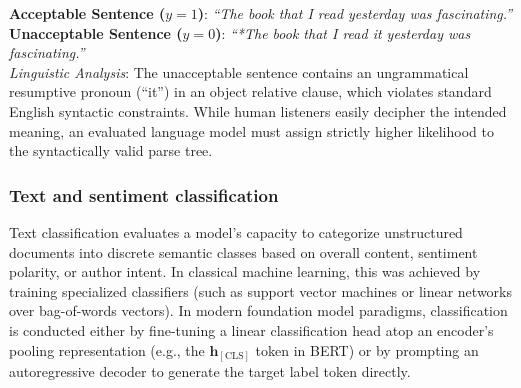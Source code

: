 \documentclass[../../../main.tex]{subfiles}
\begin{document}
\begin{center}
\begin{minipage}{0.95\textwidth}
\begin{tcolorbox}[colback=cardBg,colframe=cardLine,arc=2pt,boxrule=0.5pt,title=\textbf{Task Example: Grammatical Acceptability (CoLA)}]
\small\sffamily
\textbf{Acceptable Sentence ($y = 1$)}: \textit{``The book that I read yesterday was fascinating.''} \\
\textbf{Unacceptable Sentence ($y = 0$)}: \textit{``*The book that I read it yesterday was fascinating.''} \\
\textit{Linguistic Analysis}: The unacceptable sentence contains an ungrammatical resumptive pronoun (``it'') in an object relative clause, which violates standard English syntactic constraints. While human listeners easily decipher the intended meaning, an evaluated language model must assign strictly higher likelihood to the syntactically valid parse tree.
\end{tcolorbox}
\end{minipage}
\end{center}

\subsubsection{Text and sentiment classification}
\label{subsec:text_classification}
Text classification evaluates a model's capacity to categorize unstructured documents into discrete semantic classes based on overall content, sentiment polarity, or author intent. In classical machine learning, this was achieved by training specialized classifiers (such as support vector machines or linear networks over bag-of-words vectors). In modern foundation model paradigms, classification is conducted either by fine-tuning a linear classification head atop an encoder's pooling representation (e.g., the $\mathbf{h}_{[\text{CLS}]}$ token in BERT) or by prompting an autoregressive decoder to generate the target label token directly.
\end{document}
